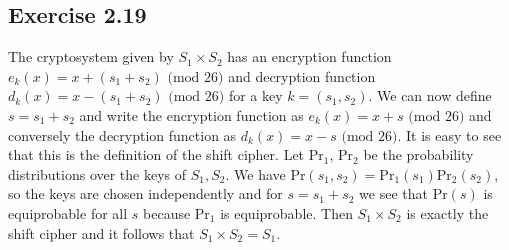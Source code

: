\documentclass[12pt]{article}
\begin{document}
\subsection*{Exercise 2.19}

The cryptosystem given by $S_1 \times S_2$ has an encryption function $e_k(x) = x + (s_1 + s_2) \text{ (mod } 26)$ and decryption function $d_k(x) = x - (s_1 + s_2) \text{ (mod } 26)$ for a key $k = (s_1,s_2)$. We can now define $s = s_1 + s_2$ and write the encryption function as $e_k(x) = x + s \text{ (mod } 26)$ and conversely the decryption function as $d_k(x) = x - s \text{ (mod } 26)$. It is easy to see that this is the definition of the shift cipher. Let $\text{Pr}_1$, $\text{Pr}_2$ be the probability distributions over the keys of $S_1, S_2$. We have $\text{Pr}(s_1,s_2) = \text{Pr}_1(s_1) \text{Pr}_2(s_2)$, so the keys are chosen independently and for $s = s_1 + s_2$ we see that $\text{Pr}(s)$ is equiprobable for all $s$ because $\text{Pr}_1$ is equiprobable. Then $S_1 \times S_2$ is exactly the shift cipher and it follows that $S_1 \times S_2 = S_1$.
\end{document}
